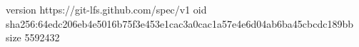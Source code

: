 version https://git-lfs.github.com/spec/v1
oid sha256:64edc206eb4e5016b75f3e453e1cac3a0cac1a57e4e6d04ab6ba45cbcdc189bb
size 5592432
